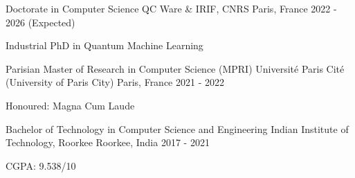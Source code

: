 

\begin{cventries}

  \cventry
    {Doctorate in Computer Science} %
    {QC Ware \& IRIF, CNRS} %
    {Paris, France} %
    {2022 - 2026 (Expected)} %
    {
      \begin{cvitems} %
        \item {Industrial PhD in Quantum Machine Learning}
      \end{cvitems}
    }

  \cventry
    {Parisian Master of Research in Computer Science (MPRI)} %
    {Université Paris Cité (University of Paris City)} %
    {Paris, France} %
    {2021 - 2022} %
    {
      \begin{cvitems} %
        \item {Honoured: Magna Cum Laude}
      \end{cvitems}
    }

  \cventry
    {Bachelor of Technology in Computer Science and Engineering} %
    {Indian Institute of Technology, Roorkee} %
    {Roorkee, India} %
    {2017 - 2021} %
    {
      \begin{cvitems} %
        \item {CGPA: 9.538/10}
      \end{cvitems}
    }



\end{cventries}
